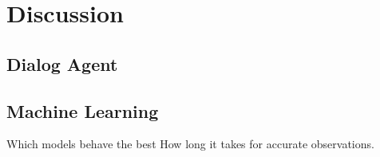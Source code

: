 
\chapter{Discussion}\label{chapter:discussion}

\section{Dialog Agent}
\section{Machine Learning}
Which models behave the best
How long it takes for accurate observations.
